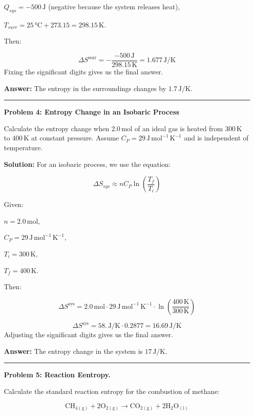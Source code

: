 \documentclass[
  9pt,
]{extbook}
\theoremstyle{definition}
\theoremstyle{definition}
\theoremstyle{definition}
\theoremstyle{definition}
\theoremstyle{remark}
\begin{document}
\(Q_{sys} = -500\,\text{J}\) (negative because the system releases heat),

\(T_{surr} = 25\,\text{°C} + 273.15 = 298.15\,\text{K}\).

Then:

\[\Delta S^{\text{surr}} = -\frac{-500\,\text{J}}{298.15\,\text{K}} = 1.677\,\text{J/K}\]
Fixing the significant digits gives us the final answer.

\textbf{Answer:} The entropy in the surroundings changes by \(1.7\,\text{J/K}\).

\begin{center}\rule{0.5\linewidth}{0.5pt}\end{center}

\textbf{Problem 4: Entropy Change in an Isobaric Process}

Calculate the entropy change when \(2.0\,\text{mol}\) of an ideal gas is heated from \(300\,\text{K}\) to \(400\,\text{K}\) at constant pressure. Assume \(C_P = 29\,\text{J} \, \text{mol}^{-1} \, \text{K}^{-1}\) and is independent of temperature.

\textbf{Solution:} For an isobaric process, we use the equation:

\[\Delta S_{sys} \approx nC_P \ln \left(\frac{T_f}{T_i}\right)\]

Given:

\(n = 2.0\,\text{mol}\),

\(C_P = 29\,\text{J} \, \text{mol}^{-1} \, \text{K}^{-1}\),

\(T_i = 300\,\text{K}\),

\(T_f = 400\,\text{K}\).

Then:

\[\Delta S^{\text{sys}} = 2.0\,\text{mol} \cdot 29\,\text{J} \, \text{mol}^{-1} \, \text{K}^{-1} \cdot \ln \left(\frac{400\,\text{K}}{300\,\text{K}}\right)\]

\[\Delta S^{\text{sys}} = 58.\,\text{J/K} \cdot 0.2877 = 16.69\,\text{J/K}\]
Adjusting the significant digits gives us the final answer.

\textbf{Answer:} The entropy change in the system is \(17\,\text{J/K}\).

\begin{center}\rule{0.5\linewidth}{0.5pt}\end{center}

\textbf{Problem 5: Reaction Eentropy.}

Calculate the standard reaction entropy for the combustion of methane:

\[\text{CH}_{4(\text{g})} + 2\text{O}_{2(\text{g})} \rightarrow \text{CO}_{2(\text{g})} + 2\text{H}_2\text{O}_{(\text{l})}\]
\end{document}
